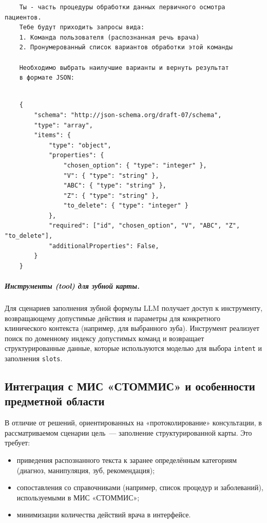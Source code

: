 \begin{verbatim}
    Ты - часть процедуры обработки данных первичного осмотра пациентов.
    Тебе будут приходить запросы вида:
    1. Команда пользователя (распознанная речь врача)
    2. Пронумерованный список вариантов обработки этой команды

    Необходимо выбрать наилучшие варианты и вернуть результат
    в формате JSON:
\end{verbatim}
\begin{lstlisting}[breaklines=true, basicstyle=\ttfamily\small]

    {
        "schema": "http://json-schema.org/draft-07/schema",
        "type": "array",
        "items": {
            "type": "object",
            "properties": {
                "chosen_option": { "type": "integer" },
                "V": { "type": "string" },
                "ABC": { "type": "string" },
                "Z": { "type": "string" },
                "to_delete": { "type": "integer" }
            },
            "required": ["id", "chosen_option", "V", "ABC", "Z", "to_delete"],
            "additionalProperties": False,
        }
    }
\end{lstlisting}

\subparagraph{Инструменты (tool) для зубной карты.}
Для сценариев заполнения зубной формулы LLM получает доступ к инструменту, возвращающему допустимые действия и параметры
для конкретного клинического контекста (например, для выбранного зуба).
Инструмент реализует поиск по доменному индексу допустимых команд и возвращает структурированные данные,
которые используются моделью для выбора \texttt{intent} и заполнения \texttt{slots}.

\subsection{Интеграция с МИС «СТОММИС» и особенности предметной области}
\label{subsec:stommis}

В отличие от решений, ориентированных на «протоколирование» консультации, в рассматриваемом сценарии цель~--- заполнение структурированной карты.
Это требует:
\begin{itemize}
    \item приведения распознанного текста к заранее определённым категориям (диагноз, манипуляция, зуб, рекомендация);
    \item сопоставления со справочниками (например, список процедур и заболеваний), используемыми в МИС «СТОММИС»;
    \item минимизации количества действий врача в интерфейсе.
\end{itemize}

